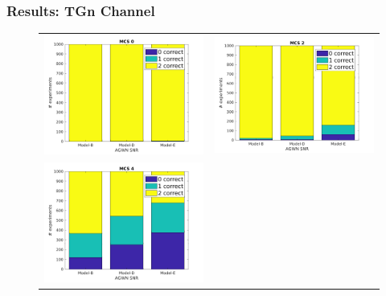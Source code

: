 \documentclass[accentcolor=tud8b,colorbacktitle]{tudbeamer}
\begin{document}
\begin{frame}
\frametitle{Results: TGn Channel}
\begin{figure}[H]
	\centering
	\vspace{-0.5cm}
	\begin{tabular}{cc}
		\includegraphics[height=0.52\textheight]{../../gfx/plots/tgn-mcs0} &
		\includegraphics[height=0.52\textheight]{../../gfx/plots/tgn-mcs2} \\
		\includegraphics[height=0.52\textheight]{../../gfx/plots/tgn-mcs4} &

\end{tabular}
\end{figure}
\end{frame}
\end{document}
